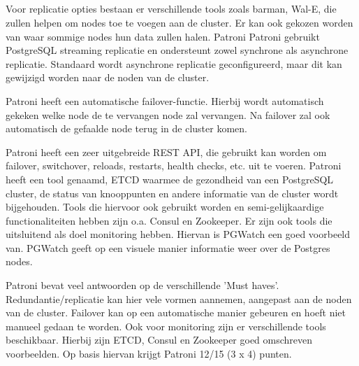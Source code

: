 


\subsection{}
\label{subsec: Oplossing 1: Patroni}

\subsubsection{}
\label{subsubsec:Must have}

Voor replicatie opties bestaan er verschillende tools zoals barman, Wal-E, die zullen helpen om nodes toe te voegen aan de cluster. Er kan ook gekozen worden van waar sommige nodes hun data zullen halen. Patroni Patroni gebruikt PostgreSQL streaming replicatie en ondersteunt zowel synchrone als asynchrone replicatie. Standaard wordt asynchrone replicatie geconfigureerd, maar dit kan gewijzigd worden naar de noden van de cluster.

Patroni heeft een automatische failover-functie. Hierbij wordt automatisch gekeken welke node de te vervangen node zal vervangen. Na failover zal ook automatisch de gefaalde node terug in de cluster komen.

Patroni heeft een zeer uitgebreide REST API, die gebruikt kan worden om failover, switchover, reloads, restarts, health checks, etc. uit te voeren. Patroni heeft een tool genaamd, ETCD waarmee de gezondheid van een PostgreSQL cluster, de status van knooppunten en andere informatie van de cluster wordt bijgehouden. Tools die hiervoor ook gebruikt worden en semi-gelijkaardige functionaliteiten hebben zijn o.a. Consul en Zookeeper. Er zijn ook tools die uitsluitend als doel monitoring hebben. Hiervan is PGWatch een goed voorbeeld van. PGWatch geeft op een visuele manier informatie weer over de Postgres nodes.

Patroni bevat veel antwoorden op de verschillende 'Must haves'. Redundantie/replicatie kan hier vele vormen aannemen, aangepast aan de noden van de cluster. Failover kan op een automatische manier gebeuren en hoeft niet manueel gedaan te worden. Ook voor monitoring zijn er verschillende tools beschikbaar. Hierbij zijn ETCD, Consul en Zookeeper goed omschreven voorbeelden.
Op basis hiervan krijgt Patroni 12/15 (3 x 4) punten.

